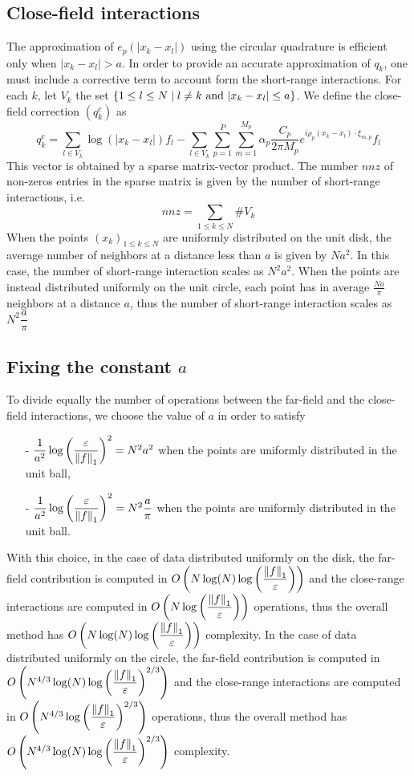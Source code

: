 \documentclass[11pt,a4paper]{article}
\begin{document}
\subsection{Close-field interactions}

The approximation of $e_p(|x_k - x_l|)$ using the circular quadrature is efficient only when $|x_k - x_l| > a$. In order to provide an accurate approximation of $q_k$, one must include a corrective term to account form the short-range interactions. For each $k$, let $V_k$ the set $\left\{1 \leq l \leq N\mathrel{}\middle|\mathrel{} l \neq k \textup{ and } |x_k - x_l| \leq a\right\}$. We define the close-field correction $(q_k^{c})$ as 
\[ q_k^c = \sum_{l \in V_k} \log(|x_k - x_l|)f_l - \sum_{l \in V_k}\sum_{p=1}^P\sum_{m=1}^{M_p}{ \alpha_p \dfrac{C_p}{2\pi {M_p}}e^{i \rho_p (x_k - x_l) \cdot \xi_{m,p}}}f_l \]
This vector is obtained by a sparse matrix-vector product. The number $nnz$ of non-zeros entries in the sparse matrix is given by the number of short-range interactions, i.e. 
\[ nnz = \sum_{1 \leq k \leq N } \#V_k\]
When the points $(x_k)_{1\leq k \leq N}$ are uniformly distributed on the unit disk, the average number of neighbors at a distance less than $a$ is given by $N a^2$. In this case, the number of short-range interaction scales as $N^2a^2$. When the points are instead distributed uniformly on the unit circle, each point has in average $\frac{Na}{\pi}$ neighbors at a distance $a$, thus the number of short-range interaction scales as $N^2 \dfrac{a}{\pi} $

\subsection{Fixing the constant $a$}
\label{fixa}
To divide equally the number of operations between the far-field and the close-field interactions, we choose the value of $a$ in order to satisfy
\begin{itemize}
\item[-] $\dfrac{1}{a^2} \log\left( \dfrac{\varepsilon}{\left\|f\right\|_1}\right)^2 = N^2 a^2$ when the points are uniformly distributed in the unit ball, 
\item[-] $\dfrac{1}{a^2} \log\left( \dfrac{\varepsilon}{\left\|f\right\|_1}\right)^2 = N^2 \dfrac{a}{\pi}$ when the points are uniformly distributed in the unit ball. 
\end{itemize}

With this choice, in the case of data distributed uniformly on the disk, the far-field contribution is computed in $O\left(N \log(N) \log\left(\dfrac{\left\|f\right\|_1}{\varepsilon}\right)\right)$ and the close-range interactions are computed in $O\left(N \log\left(\dfrac{\left\|f\right\|_1}{\varepsilon}\right)\right)$ operations, thus the overall method has $O\left(N \log(N) \log\left(\dfrac{\left\|f\right\|_1}{\varepsilon}\right)\right)$ complexity. In the case of data distributed uniformly on the circle, the far-field contribution is computed in $O\left(N^{4/3} \log(N) \log\left(\dfrac{\left\|f\right\|_1}{\varepsilon}\right)^{2/3}\right)$ and the close-range interactions are computed in $O\left(N^{4/3} \log\left(\dfrac{\left\|f\right\|_1}{\varepsilon}\right)^{2/3}\right)$ operations, thus the overall method has $O\left(N^{4/3} \log(N) \log\left(\dfrac{\left\|f\right\|_1}{\varepsilon}\right)^{2/3}\right)$ complexity. 
\end{document}
